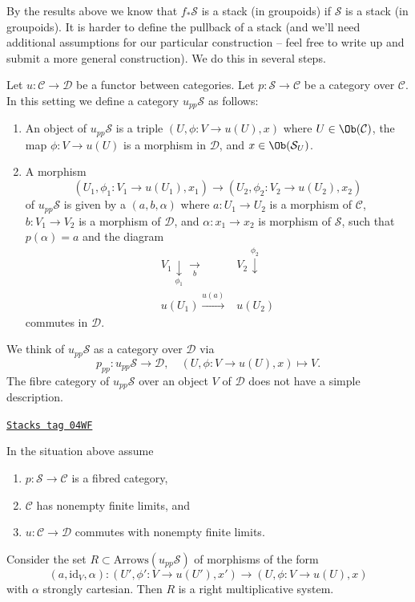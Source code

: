 By the results above we know that $f_*\mathcal{S}$ is a stack (in groupoids)
if $\mathcal{S}$ is a stack (in groupoids).
It is harder to define the pullback of a stack (and we'll need additional
assumptions for our particular construction -- feel free to write up and
submit a more general construction). We do this in several steps.

\medskip\noindent
Let $u : \mathcal{C} \to \mathcal{D}$ be a functor between categories.
Let $p : \mathcal{S} \to \mathcal{C}$ be a category over $\mathcal{C}$.
In this setting we define a category $u_{pp}\mathcal{S}$ as follows:
\begin{enumerate}
\item An object of $u_{pp}\mathcal{S}$ is a triple
$(U, \phi : V \to u(U), x)$ where $U \in \Ob(\mathcal{C})$,
the map $\phi : V \to u(U)$ is a morphism in $\mathcal{D}$,
and $x \in \Ob(\mathcal{S}_U)$.
\item A morphism
$$
(U_1, \phi_1 : V_1 \to u(U_1), x_1)
\longrightarrow
(U_2, \phi_2 : V_2 \to u(U_2), x_2)
$$
of $u_{pp}\mathcal{S}$ is given by a
$(a, b, \alpha)$ where $a : U_1 \to U_2$ is a morphism of $\mathcal{C}$,
$b : V_1 \to V_2$ is a morphism of $\mathcal{D}$, and
$\alpha : x_1 \to x_2$ is morphism of $\mathcal{S}$,
such that $p(\alpha) = a$ and the diagram
$$
\begin{array}{cc}V_1 \underset{\phi_1}{\downarrow}\underset{b}{\longrightarrow} & V_2 \overset{\phi_2}{\downarrow} \\ u(U_1) \overset{u(a)}{\longrightarrow} & u(U_2)\end{array}
$$
commutes in $\mathcal{D}$.
\end{enumerate}
We think of $u_{pp}\mathcal{S}$ as a category over $\mathcal{D}$ via
$$
p_{pp} : u_{pp}\mathcal{S} \longrightarrow \mathcal{D},
\quad
(U, \phi : V \to u(U), x) \longmapsto V.
$$
The fibre category of $u_{pp}\mathcal{S}$ over an object $V$ of $\mathcal{D}$
does not have a simple description.

\begin{lemma}
\label{stacks-lemma-right-multiplicative-system}
\href{https://stacks.math.columbia.edu/tag/04WF}{\texttt{Stacks tag 04WF}}

In the situation above assume
\begin{enumerate}
\item $p : \mathcal{S} \to \mathcal{C}$ is a fibred category,
\item $\mathcal{C}$ has nonempty finite limits, and
\item $u : \mathcal{C} \to \mathcal{D}$ commutes with nonempty finite limits.
\end{enumerate}
Consider the set $R \subset \text{Arrows}(u_{pp}\mathcal{S})$ of morphisms
of the form
$$
(a, \text{id}_V, \alpha) :
(U', \phi' : V \to u(U'), x')
\longrightarrow
(U, \phi : V \to u(U), x)
$$
with $\alpha$ strongly cartesian. Then $R$ is a right multiplicative system.
\end{lemma}

